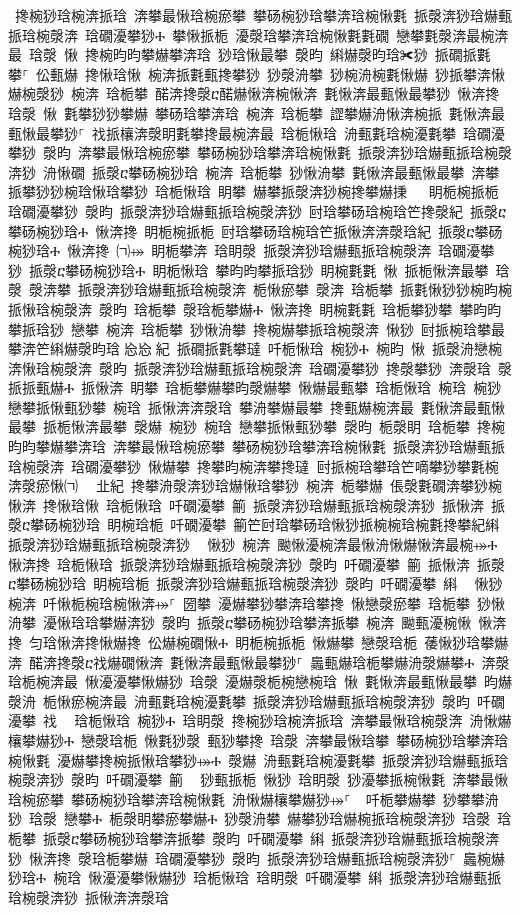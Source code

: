 ﻿\documentclass[output=paper]{langsci/langscibook}
\begin{document}
\begin{exe}
{\begin{exe}
 搀椀猀琀椀渀挀琀 渀攀最愀琀椀瘀攀 攀砀椀猀琀攀渀琀椀愀氀 挀漀渀猀琀爀甀挀琀椀漀渀 琀礀瀀攀猀Ⰰ 攀愀挀栀 瀀漀琀攀渀琀椀愀氀氀礀 戀攀氀漀渀最椀渀最 琀漀 愀 搀椀昀昀攀爀攀渀琀 猀琀愀最攀 漀昀 䌀爀漀昀琀✀猀 挀礀挀氀攀⸀ 伀甀爀 搀愀琀愀 椀渀挀氀甀搀攀猀 猀漀洀攀 猀椀洀椀氀愀爀 猀挀攀渀愀爀椀漀猀 椀渀 琀栀攀 䤀渀搀漀ⴀ䤀爀愀渀椀愀渀 氀愀渀最甀愀最攀猀 愀渀搀 琀漀 愀 氀攀猀猀攀爀 攀砀琀攀渀琀 椀渀 琀栀攀 䜀攀爀洀愀渀椀挀 氀愀渀最甀愀最攀猀⸀ 䄀挀欀渀漀眀氀攀搀最椀渀最 琀栀愀琀 洀甀氀琀椀瀀氀攀 琀礀瀀攀猀 漀昀 渀攀最愀琀椀瘀攀 攀砀椀猀琀攀渀琀椀愀氀 挀漀渀猀琀爀甀挀琀椀漀渀猀 洀愀礀 挀漀ⴀ攀砀椀猀琀 椀渀 琀栀攀 猀愀洀攀 氀愀渀最甀愀最攀 渀攀挀攀猀猀椀琀愀琀攀猀 琀栀愀琀 眀攀 爀攀挀漀渀猀椀搀攀爀㨀 ㄀⤀ 眀栀椀挀栀 琀礀瀀攀猀 漀昀 挀漀渀猀琀爀甀挀琀椀漀渀猀 尀琀攀砀琀椀琀笀搀漀紀 挀漀ⴀ攀砀椀猀琀Ⰰ 愀渀搀 眀栀椀挀栀 尀琀攀砀琀椀琀笀挀愀渀渀漀琀紀 挀漀ⴀ攀砀椀猀琀Ⰰ 愀渀搀 ㈀⤀ 眀栀攀渀 琀眀漀 挀漀渀猀琀爀甀挀琀椀漀渀 琀礀瀀攀猀 挀漀ⴀ攀砀椀猀琀Ⰰ 眀栀愀琀 攀昀昀攀挀琀猀 眀椀氀氀 愀 挀栀愀渀最攀 琀漀 漀渀攀 挀漀渀猀琀爀甀挀琀椀漀渀 栀愀瘀攀 漀渀 琀栀攀 挀氀愀猀猀椀昀椀挀愀琀椀漀渀 漀昀 琀栀攀 漀琀栀攀爀Ⰰ 愀渀搀 眀椀氀氀 琀栀攀猀攀 攀昀昀攀挀琀猀 戀攀 椀渀 琀栀攀 猀愀洀攀 搀椀爀攀挀琀椀漀渀 愀猀 尀挀椀琀攀最攀渀笀䌀爀漀昀琀㄀㤀㤀㄀紀 挀礀挀氀攀㼀 吀栀愀琀 椀猀Ⰰ 椀昀 愀 挀漀洀戀椀渀愀琀椀漀渀 漀昀 挀漀渀猀琀爀甀挀琀椀漀渀 琀礀瀀攀猀 搀漀攀猀 渀漀琀 漀挀挀甀爀Ⰰ 挀愀渀 眀攀 琀栀攀爀攀昀漀爀攀 愀爀最甀攀 琀栀愀琀 椀琀 椀猀 戀攀挀愀甀猀攀 椀琀 挀愀渀渀漀琀 攀洀攀爀最攀 搀甀爀椀渀最 氀愀渀最甀愀最攀 挀栀愀渀最攀 漀爀 椀猀 椀琀 戀攀挀愀甀猀攀 漀昀 栀漀眀 琀栀攀 搀椀昀昀攀爀攀渀琀 渀攀最愀琀椀瘀攀 攀砀椀猀琀攀渀琀椀愀氀 挀漀渀猀琀爀甀挀琀椀漀渀 琀礀瀀攀猀 愀爀攀 搀攀昀椀渀攀搀㼀਀਀尀挀椀琀攀琀笀嘀攀猀攀氀椀渀漀瘀愀㈀　㄀㐀紀 搀攀洀漀渀猀琀爀愀琀攀猀 椀渀 栀攀爀 倀漀氀礀渀攀猀椀愀渀 搀愀琀愀 琀栀愀琀 吀礀瀀攀 䈀 挀漀渀猀琀爀甀挀琀椀漀渀猀 挀愀渀 挀漀ⴀ攀砀椀猀琀 眀椀琀栀 吀礀瀀攀 䈀笀尀琀攀砀琀愀猀挀椀椀琀椀氀搀攀紀䌀 挀漀渀猀琀爀甀挀琀椀漀渀猀 ⠀愀猀 椀渀 䬀愀瀀椀渀最愀洀愀爀愀渀最椀⤀Ⰰ 愀渀搀 琀栀愀琀 挀漀渀猀琀爀甀挀琀椀漀渀猀 漀昀 吀礀瀀攀 䈀 挀愀渀 挀漀ⴀ攀砀椀猀琀 眀椀琀栀 挀漀渀猀琀爀甀挀琀椀漀渀猀 漀昀 吀礀瀀攀 䌀 ⠀愀猀 椀渀 吀愀栀椀琀椀愀渀⤀⸀ 圀攀 瀀爀攀猀攀渀琀攀搀 愀戀漀瘀攀 琀栀攀 猀愀洀攀 瀀愀琀琀攀爀渀猀 漀昀 挀漀ⴀ攀砀椀猀琀攀渀挀攀 椀渀 䬀甀瀀椀愀 愀渀搀 匀琀愀渀搀愀爀搀 伀爀椀礀愀Ⰰ 眀栀椀挀栀 愀爀攀 戀漀琀栀 䔀愀猀琀攀爀渀 䤀渀搀漀ⴀ䄀爀礀愀渀 氀愀渀最甀愀最攀猀⸀ 䘀甀爀琀栀攀爀洀漀爀攀Ⰰ 渀漀琀栀椀渀最 愀瀀瀀攀愀爀猀 琀漀 瀀爀漀栀椀戀椀琀 愀 氀愀渀最甀愀最攀 昀爀漀洀 栀愀瘀椀渀最 洀甀氀琀椀瀀氀攀 挀漀渀猀琀爀甀挀琀椀漀渀猀 漀昀 吀礀瀀攀 䄀 ⠀琀栀愀琀 椀猀Ⰰ 琀眀漀 搀椀猀琀椀渀挀琀 渀攀最愀琀椀漀渀 洀愀爀欀攀爀猀Ⰰ 戀漀琀栀 愀氀猀漀 甀猀攀搀 琀漀 渀攀最愀琀攀 攀砀椀猀琀攀渀琀椀愀氀 瀀爀攀搀椀挀愀琀攀猀⤀Ⰰ 漀爀 洀甀氀琀椀瀀氀攀 挀漀渀猀琀爀甀挀琀椀漀渀猀 漀昀 吀礀瀀攀 䈀 ⠀猀甀挀栀 愀猀 琀眀漀 猀瀀攀挀椀愀氀 渀攀最愀琀椀瘀攀 攀砀椀猀琀攀渀琀椀愀氀 洀愀爀欀攀爀猀⤀⸀ ਀਀吀栀攀爀攀 猀攀攀洀猀 琀漀 戀攀Ⰰ 栀漀眀攀瘀攀爀Ⰰ 猀漀洀攀 爀攀猀琀爀椀挀琀椀漀渀猀 琀漀 琀栀攀 挀漀ⴀ攀砀椀猀琀攀渀挀攀 漀昀 吀礀瀀攀 䌀 挀漀渀猀琀爀甀挀琀椀漀渀猀 愀渀搀 漀琀栀攀爀 琀礀瀀攀猀 漀昀 挀漀渀猀琀爀甀挀琀椀漀渀猀⸀ 䘀椀爀猀琀Ⰰ 椀琀 愀瀀瀀攀愀爀猀 琀栀愀琀 琀眀漀 吀礀瀀攀 䌀 挀漀渀猀琀爀甀挀琀椀漀渀猀 挀愀渀渀漀琀 
\end{exe}}
\end{exe}
\end{document}
